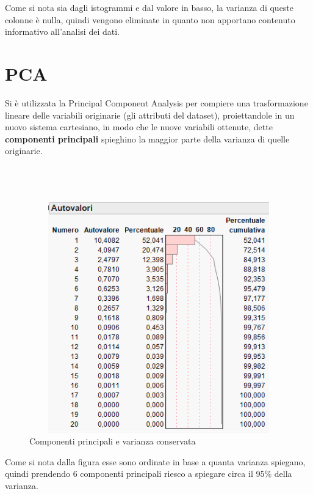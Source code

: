 Come si nota sia dagli istogrammi e dal valore in basso, la varianza di queste colonne è nulla, quindi vengono eliminate in quanto non apportano contenuto informativo all'analisi dei dati.\\

\section{PCA}
Si è utilizzata la Principal Component Analysis per compiere una trasformazione lineare delle variabili originarie (gli attributi del dataset), proiettandole in un nuovo sistema cartesiano, in modo che le nuove variabili ottenute, dette \textbf{componenti principali} spieghino la maggior parte della varianza di quelle originarie.\\\\\\\\

\begin{figure}[!h]
	\centering
	\includegraphics[width=12cm, height=10cm]{./immagine/autovalori.png}
	\caption{Componenti principali e varianza conservata}
	\label{fig:autovalori}
\end{figure}
Come si nota dalla figura esse sono ordinate in base a quanta varianza spiegano, quindi prendendo 6 componenti principali riesco a spiegare circa il 95\% della varianza.\\

